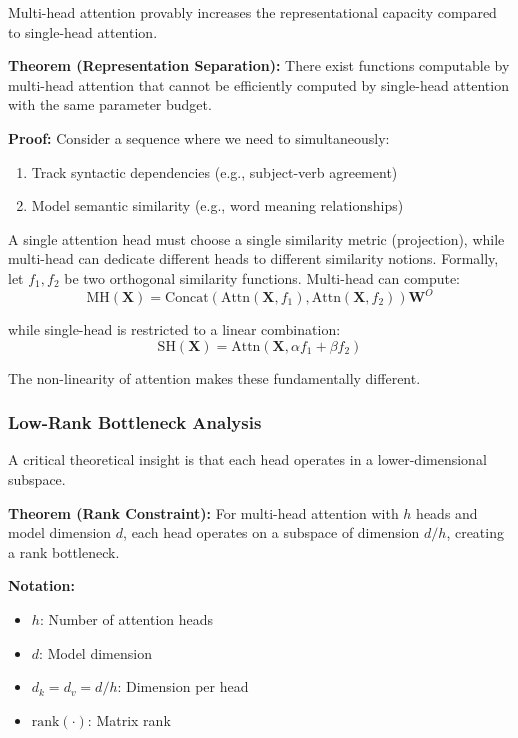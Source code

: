 Multi-head attention provably increases the representational capacity compared to single-head attention.

\textbf{Theorem (Representation Separation):} There exist functions computable by multi-head attention that cannot be efficiently computed by single-head attention with the same parameter budget.

\textbf{Proof:} Consider a sequence where we need to simultaneously:
\begin{enumerate}
    \item Track syntactic dependencies (e.g., subject-verb agreement)
    \item Model semantic similarity (e.g., word meaning relationships)
\end{enumerate}

A single attention head must choose a single similarity metric (projection), while multi-head can dedicate different heads to different similarity notions. Formally, let $f_1, f_2$ be two orthogonal similarity functions. Multi-head can compute:
\begin{equation}
\text{MH}(\mathbf{X}) = \text{Concat}(\text{Attn}(\mathbf{X}, f_1), \text{Attn}(\mathbf{X}, f_2))\mathbf{W}^O
\end{equation}

while single-head is restricted to a linear combination:
\begin{equation}
\text{SH}(\mathbf{X}) = \text{Attn}(\mathbf{X}, \alpha f_1 + \beta f_2)
\end{equation}

The non-linearity of attention makes these fundamentally different.

\subsubsection{Low-Rank Bottleneck Analysis}

A critical theoretical insight is that each head operates in a lower-dimensional subspace.

\textbf{Theorem (Rank Constraint):} For multi-head attention with $h$ heads and model dimension $d$, each head operates on a subspace of dimension $d/h$, creating a rank bottleneck.

\begin{notationbox}
\textbf{Notation:}
\begin{itemize}
    \item $h$: Number of attention heads
    \item $d$: Model dimension
    \item $d_k = d_v = d/h$: Dimension per head
    \item $\text{rank}(\cdot)$: Matrix rank
\end{itemize}
\end{notationbox}

